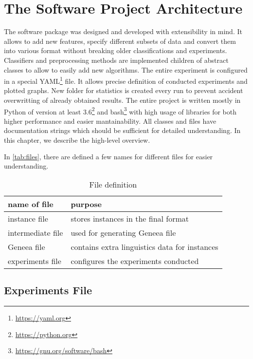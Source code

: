 \chapter{The Software Project Architecture}
\label{chap:arch}

The software package was designed and developed with extensibility in mind.
It allows to add new features, specify different subsets of data and convert them into various format without breaking older classifications and experiments.
Classifiers and preprocessing methods are implemented children of abstract classes
to allow to easily add new algorithms.
The entire experiment is configured in a special YAML\footnote{\url{https://yaml.org}} file.
It allows precise definition of conducted experiments and plotted graphs.
New folder for statistics is created every run to prevent accident overwritting of already obtained results.
The entire project is written mostly in Python of version at least 3.6\footnote{\url{https://python.org}} and bash\footnote{\url{https://gnu.org/software/bash}} with high usage of libraries for both higher performance and easier mantainability.
All classes and files have documentation strings which should be sufficient
for detailed understanding.
In this chapter, we describe the high-level overview.

In \autoref{tab:files}, there are defined a few names for different files for easier understanding.

\begin{table}[h]

\centering
\begin{tabular}{ll}
\toprule
\textbf{name of file}& \textbf{purpose} \\
\midrule
instance file		 & stores instances in the final format \\
intermediate file	 & used for generating Geneea file \\
Geneea file			 & contains extra linguistics data for instances \\
experiments file	 & configures the experiments conducted \\
\bottomrule
\end{tabular}

\caption{File definition}\label{tab:files}
\end{table}



\section{Experiments File}

